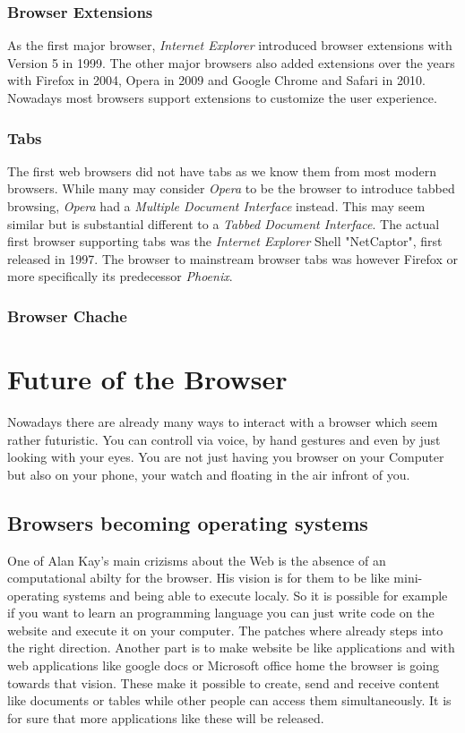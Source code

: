 \documentclass[runningheads]{llncs}
\begin{document}
			\subsubsection{Browser Extensions}
			As the first major browser, \textit{Internet Explorer} introduced browser extensions with Version 5 in 1999. The other major browsers also added extensions over the years with Firefox in 2004, Opera in 2009 and Google Chrome and Safari in 2010. Nowadays most browsers support extensions to customize the user experience.
			\subsubsection{Tabs}
			The first web browsers did not have tabs as we know them from most modern browsers. While many may consider \textit{Opera} to be the browser to introduce tabbed browsing, \textit{Opera} had a  \textit{Multiple Document Interface} instead. This may seem similar but is substantial different to a \textit{Tabbed Document Interface}. The actual first browser supporting tabs was the \textit{Internet Explorer} Shell "NetCaptor", first released in 1997. The browser to mainstream browser tabs was however Firefox or more specifically its predecessor \textit{Phoenix}.
			\subsubsection{Browser Chache}

	\section{Future of the Browser}
	Nowadays there are already many ways to interact with a browser which seem rather futuristic. You can controll via voice, by hand gestures and even by just looking with your eyes. You are not just having you browser on your Computer but also on your phone, your watch and floating in the air infront of you.
		\subsection{Browsers becoming operating systems}
		One of Alan Kay's main crizisms about the Web is the absence of an computational abilty for the browser. His vision is for them to be like  mini-operating systems and being able to execute localy. So it is possible for example if you want to learn an programming language you can just write code on the website and execute it on your computer. The patches where already steps into the right direction. Another part is to make website be like applications and with web applications like google docs or Microsoft office home the browser is going towards that vision. These make it possible to create, send and receive content like documents or tables while other people can access them simultaneously. It is for sure that more applications like these will be released.
\end{document}
